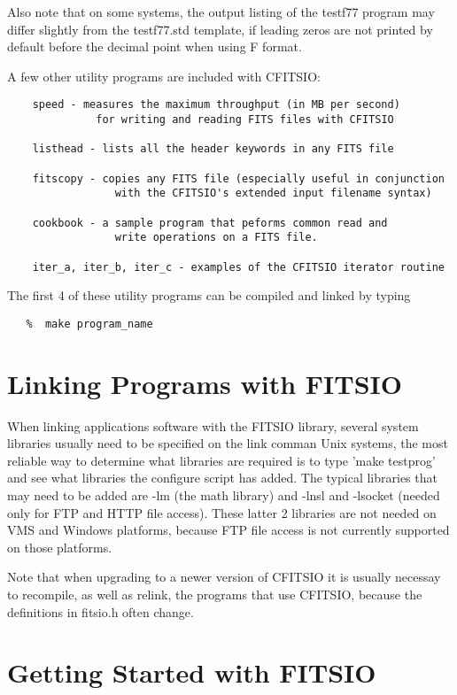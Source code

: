 \documentclass[11pt]{book}
\begin{document}
Also note that on some systems, the output listing of the testf77
program may differ slightly from the testf77.std template, if leading
zeros are not printed by default before the decimal point when using F
format.

A few other utility  programs are included with CFITSIO:

\begin{verbatim}
    speed - measures the maximum throughput (in MB per second)
              for writing and reading FITS files with CFITSIO

    listhead - lists all the header keywords in any FITS file

    fitscopy - copies any FITS file (especially useful in conjunction
                 with the CFITSIO's extended input filename syntax)

    cookbook - a sample program that peforms common read and
                 write operations on a FITS file.

    iter_a, iter_b, iter_c - examples of the CFITSIO iterator routine
\end{verbatim}

The first 4 of these utility programs can be compiled and linked by typing

\begin{verbatim}
   %  make program_name
\end{verbatim}


\section{Linking Programs with FITSIO}

When linking applications software with the FITSIO library, several system libraries usually need to be specified on the link comman
Unix systems, the most reliable way to determine what libraries are required
is to type 'make testprog' and see what libraries the configure script has
added.  The typical libraries that may need to be added are -lm (the math
library) and -lnsl and -lsocket (needed only for FTP and HTTP file access).
These latter 2 libraries are not needed on VMS and Windows platforms,
because FTP file access is not currently supported on those platforms.

Note that when upgrading to a newer version of CFITSIO it is usually
necessay to recompile, as well as relink, the programs that use CFITSIO,
because the definitions in fitsio.h often change.


\section{Getting Started with FITSIO}
\end{document}
